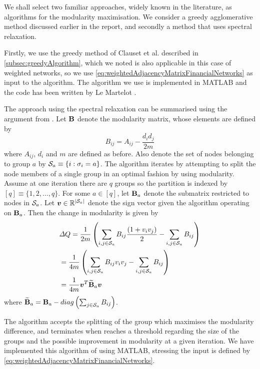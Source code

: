 We shall select two familiar approaches, widely known in the literature, as algorithms for the modularity maximisation. We consider a greedy agglomerative method discussed earlier in the report, and secondly a method that uses spectral relaxation.

Firstly, we use the greedy method of Clauset et al. \cite{CNM04} described in \cref{subsec:greedyAlgorithm}, which we noted is also applicable in this case of weighted networks, so we use \cref{eq:weightedAdjacencyMatrixFinancialNetworks} as input to the algorithm.
The algorithm we use is implemented in MATLAB and the code has been written by Le Martelot \cite{ELM}.

The approach using the spectral relaxation can be summarised using the argument from \cite{DM}. Let $\mathbf B$ denote the modularity matrix, whose elements are defined by
\begin{equation}
\label{eq:modularityMatrixFinancialNetworks}
	B_{ij} = A_{ij} - \frac{d_{i}d_{j}}{2m}
\end{equation}
where $A_{ij}$, $d_{i}$ and $m$ are defined as before.
Also denote the set of nodes belonging to group $a$ by $\mathcal S_{a} \equiv \{i:\sigma_{i} = a\}$.
The algorithm iterates by attempting to split the node members of a single group in an optimal fashion by using modularity.
Assume at one iteration there are $q$ groups so the partition is indexed by $[q] \equiv \{1,2,\dots,q\}$.
For some $a \in [q]$, let $\mathbf B_{a}$ denote the submatrix restricted to nodes in $\mathcal S_{a}$.
Let $\vecvar{v} \in \realsR^{\cardinality{\setvar{S}_{a}}}$ denote the sign vector given the algorithm operating on $\mathbf B_{a}$. Then the change in modularity is given by
\begin{equation}
\label{eq:changeModularityFinancialNetworks}
	\begin{split}
		&\Delta Q = \frac{1}{2m} \left( \sum_{i,j \in \setvar{S}_{a}} B_{ij}\frac{(1+v_{i}v_{j})}{2} - \sum_{i,j \in \setvar{S}_{a}} B_{ij} \right) \\
		&= \frac{1}{4m} \left( \sum_{i,j \in \setvar{S}_{a}} B_{ij}v_{i}v_{j} - \sum_{i,j \in \setvar{S}_{a}} B_{ij} \right)  \\
		&= \frac{1}{4m} \transpose{\vecvar{v}} \widetilde{\matvar{B}}_{a} \vecvar{v}
	\end{split}
\end{equation}
where $\widetilde{\mathbf B}_{a} = \mathbf B_{a} - diag \left( \sum_{j \in \mathcal S_{a}} B_{ij} \right)$.

The algorithm accepts the splitting of the group which maximises the modularity difference, and terminates when reaches a threshold regarding the size of the groups and the possible improvement in modularity at a given iteration.
We have implemented this algorithm of \cite{DM} using MATLAB, stressing the input is defined by \cref{eq:weightedAdjacencyMatrixFinancialNetworks}.

